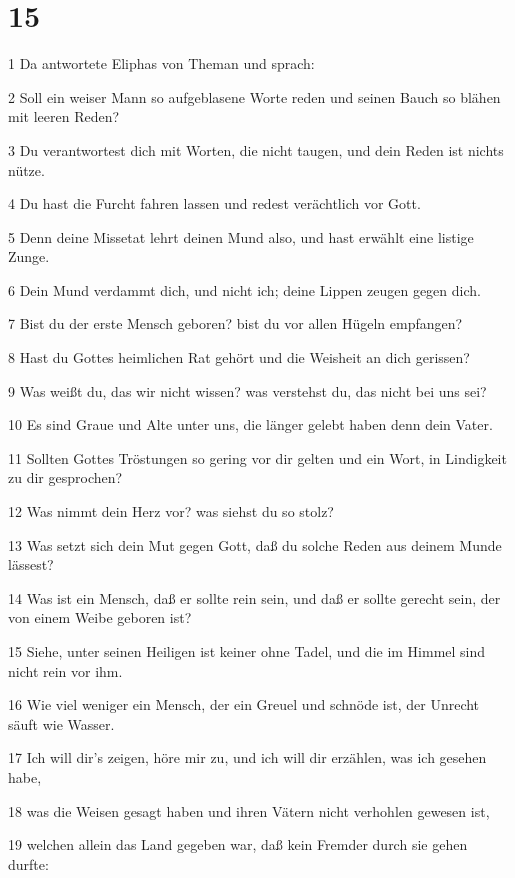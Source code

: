 \chapter{15}

\par 1 Da antwortete Eliphas von Theman und sprach:
\par 2 Soll ein weiser Mann so aufgeblasene Worte reden und seinen Bauch so blähen mit leeren Reden?
\par 3 Du verantwortest dich mit Worten, die nicht taugen, und dein Reden ist nichts nütze.
\par 4 Du hast die Furcht fahren lassen und redest verächtlich vor Gott.
\par 5 Denn deine Missetat lehrt deinen Mund also, und hast erwählt eine listige Zunge.
\par 6 Dein Mund verdammt dich, und nicht ich; deine Lippen zeugen gegen dich.
\par 7 Bist du der erste Mensch geboren? bist du vor allen Hügeln empfangen?
\par 8 Hast du Gottes heimlichen Rat gehört und die Weisheit an dich gerissen?
\par 9 Was weißt du, das wir nicht wissen? was verstehst du, das nicht bei uns sei?
\par 10 Es sind Graue und Alte unter uns, die länger gelebt haben denn dein Vater.
\par 11 Sollten Gottes Tröstungen so gering vor dir gelten und ein Wort, in Lindigkeit zu dir gesprochen?
\par 12 Was nimmt dein Herz vor? was siehst du so stolz?
\par 13 Was setzt sich dein Mut gegen Gott, daß du solche Reden aus deinem Munde lässest?
\par 14 Was ist ein Mensch, daß er sollte rein sein, und daß er sollte gerecht sein, der von einem Weibe geboren ist?
\par 15 Siehe, unter seinen Heiligen ist keiner ohne Tadel, und die im Himmel sind nicht rein vor ihm.
\par 16 Wie viel weniger ein Mensch, der ein Greuel und schnöde ist, der Unrecht säuft wie Wasser.
\par 17 Ich will dir's zeigen, höre mir zu, und ich will dir erzählen, was ich gesehen habe,
\par 18 was die Weisen gesagt haben und ihren Vätern nicht verhohlen gewesen ist,
\par 19 welchen allein das Land gegeben war, daß kein Fremder durch sie gehen durfte:
